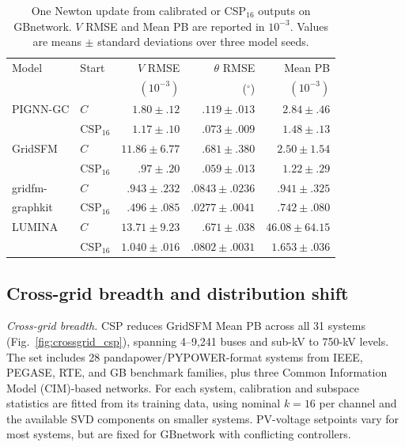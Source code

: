 \documentclass{article}
\begin{document}
\begin{table}[t]
\centering
\caption{
One Newton update from calibrated or CSP$_{16}$ outputs on GBnetwork.
$V$ RMSE and Mean PB are reported in $10^{-3}$.
Values are means $\pm$ standard deviations over three model seeds.
}
\label{tab:nr1}
\setlength{\tabcolsep}{2.2pt}
\begin{tabular}{llrrr}
\toprule
Model & Start &
$V$ RMSE &
$\theta$ RMSE &
Mean PB \\
& & $(10^{-3})$ & ($^\circ$) & $(10^{-3})$ \\
\midrule

PIGNN-GC
& $C$
& $1.80{\pm}.12$
& $.119{\pm}.013$
& $2.84{\pm}.46$ \\
& CSP$_{16}$
& $\mathbf{1.17{\pm}.10}$
& $\mathbf{.073{\pm}.009}$
& $\mathbf{1.48{\pm}.13}$ \\

\midrule
GridSFM
& $C$
& $11.86{\pm}6.77$
& $.681{\pm}.380$
& $2.50{\pm}1.54$ \\
& CSP$_{16}$
& $\mathbf{.97{\pm}.20}$
& $\mathbf{.059{\pm}.013}$
& $\mathbf{1.22{\pm}.29}$ \\

\midrule
gridfm-
& $C$
& $.943{\pm}.232$
& $.0843{\pm}.0236$
& $.941{\pm}.325$ \\
graphkit & CSP$_{16}$
& $\mathbf{.496{\pm}.085}$
& $\mathbf{.0277{\pm}.0041}$
& $\mathbf{.742{\pm}.080}$ \\

\midrule
LUMINA
& $C$
& $13.71{\pm}9.23$
& $.671{\pm}.038$
& $46.08{\pm}64.15$ \\
& CSP$_{16}$
& $\mathbf{1.040{\pm}.016}$
& $\mathbf{.0802{\pm}.0031}$
& $\mathbf{1.653{\pm}.036}$ \\

\bottomrule
\end{tabular}
\end{table}
\subsection{Cross-grid breadth and distribution shift}
\label{sec:breadth_shift}

\noindent\textit{Cross-grid breadth.}
CSP reduces GridSFM Mean PB across all 31 systems
(Fig.~\ref{fig:crossgrid_csp}), spanning 4--9,241 buses and sub-kV to
750-kV levels. The set includes 28 pandapower/PYPOWER-format systems
from IEEE, PEGASE, RTE, and GB benchmark families, plus three Common
Information Model (CIM)-based networks. For each system, calibration and
subspace statistics are fitted from its training data, using nominal
$k=16$ per channel and the available SVD components on smaller systems.
PV-voltage setpoints vary for most systems, but are fixed for GBnetwork with conflicting controllers.
\end{document}
